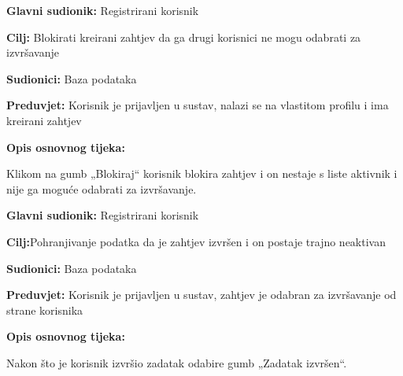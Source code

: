 \noindent {}
\begin{packed_item}
	\item \textbf{Glavni sudionik: }Registrirani korisnik
	\item  \textbf{Cilj:} Blokirati kreirani zahtjev da ga drugi korisnici ne mogu odabrati za izvršavanje
	\item  \textbf{Sudionici:} Baza podataka
	\item  \textbf{Preduvjet:} Korisnik je prijavljen u sustav, nalazi se na vlastitom profilu i ima kreirani zahtjev
	\item  \textbf{Opis osnovnog tijeka:}
	\item[] \begin{packed_enum}
		\item 	Klikom na gumb „Blokiraj“ korisnik blokira zahtjev i on nestaje s liste aktivnik i nije ga moguće odabrati za izvršavanje. 
	\end{packed_enum}
\end{packed_item}

\noindent {}
\begin{packed_item}
	\item \textbf{Glavni sudionik: }Registrirani korisnik
	\item  \textbf{Cilj:}Pohranjivanje podatka da je zahtjev izvršen i on postaje trajno neaktivan
	\item  \textbf{Sudionici:} Baza podataka
	\item  \textbf{Preduvjet:} Korisnik je prijavljen u sustav, zahtjev je odabran za izvršavanje od strane korisnika
	\item  \textbf{Opis osnovnog tijeka:}
	\item[] \begin{packed_enum}
		\item 	Nakon što je korisnik izvršio zadatak odabire gumb „Zadatak izvršen“. 
	\end{packed_enum}
\end{packed_item}

